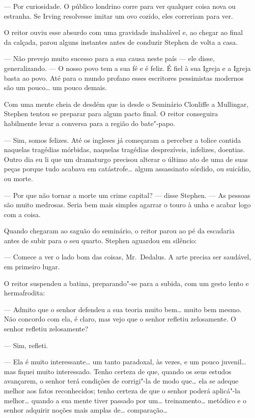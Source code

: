 --- Por curiosidade.  O público londrino corre para ver qualquer
coisa nova ou estranha.  Se Irving resolvesse imitar um ovo cozido,
eles correriam para ver.

O reitor ouviu esse absurdo com uma gravidade inabalável e, ao
chegar ao final da calçada, parou alguns instantes antes de conduzir
Stephen de volta a casa.

--- Não prevejo muito sucesso para a sua causa neste país --- ele
disse, generalizando.  --- O nosso povo tem a sua fé e é feliz.  É fiel
à sua Igreja e a Igreja basta ao povo.  Até para o mundo profano esses
escritores pessimistas modernos são um pouco\ldots{} um pouco demais.

Com uma mente cheia de desdém que ia desde o Seminário Clonliffe a
Mullingar, Stephen tentou se preparar para algum pacto final.  O reitor
conseguira habilmente levar a conversa para a região do bate"-papo.

--- Sim, somos felizes.  Até os ingleses já começaram a perceber
a tolice contida naquelas tragédias mórbidas, naquelas tragédias
desprezíveis, infelizes, doentias.  Outro dia eu li que um dramaturgo
precisou alterar o último ato de uma de suas peças porque tudo acabava
em catástrofe\ldots{} algum assassinato sórdido, ou suicídio, ou morte.

--- Por que não tornar a morte um crime capital? --- disse Stephen.
--- As pessoas são muito medrosas.  Seria bem mais simples agarrar o
touro à unha e acabar logo com a coisa.

Quando chegaram ao saguão do seminário, o reitor parou ao pé da
escadaria antes de subir para o seu quarto.  Stephen aguardou em
silêncio:

--- Comece a ver o lado bom das coisas, Mr.~Dedalus.  A arte
precisa ser saudável, em primeiro lugar.

O reitor suspendeu a batina, preparando"-se para a subida, com um
gesto lento e hermafrodita:

--- Admito que o senhor defendeu a sua teoria muito bem\ldots{} muito
bem mesmo.  Não concordo com ela, é claro, mas vejo que o senhor
refletiu zelosamente.  O senhor refletiu zelosamente?

--- Sim, refleti.

--- Ela é muito interessante\ldots{} um tanto paradoxal, às vezes, e
um pouco juvenil\ldots{} mas fiquei muito interessado.  Tenho certeza de
que, quando os seus estudos avançarem, o senhor terá condições de
corrigi"-la de modo que\ldots{} ela se adeque melhor aos fatos reconhecidos;
tenho certeza de que o senhor poderá aplicá"-la melhor\ldots{} quando a sua
mente tiver passado por um\ldots{} treinamento\ldots{} metódico e o senhor
adquirir noções mais amplas de\ldots{} comparação\ldots{}

